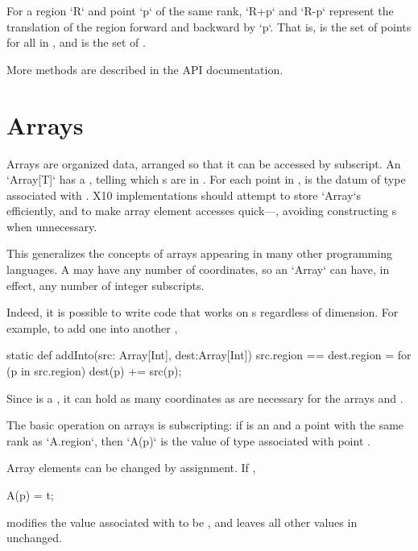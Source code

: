 For a region \xcdmath`R` and point \xcdmath`p` of the same rank,
\xcd`R+p` 
and
\xcd`R-p` 
represent the translation of the region
forward 
and backward 
by \xcdmath`p`. That is,  is the set of points
 for all  in , and  is the set of .

More  methods are described in the API documentation.

\section{Arrays}

Arrays are organized data, arranged so that it can be accessed by subscript.
An \xcd`Array[T]`  has a  , telling which
s are in .  For each point  in ,
 is the datum of type  associated with .  X10
implementations should 
attempt to store \xcd`Array`s efficiently, and to make array element accesses
quick---\eg, avoiding constructing s when unnecessary.

This generalizes the concepts of arrays appearing in many other programming
languages.  A  may have any number of coordinates, so an
\xcd`Array` can have, in effect, any number of integer subscripts.  

Indeed, it is possible to write code that works on s regardless 
of dimension.  For example, to add one   into another
, 
\begin{xten}
static def addInto(src: Array[Int], dest:Array[Int])
  {src.region == dest.region}
  = {
    for (p in src.region) 
       dest(p) += src(p);
  }
\end{xten}
\noindent
Since  is a , it can hold as many coordinates as are
necessary for the arrays  and .

The basic operation on arrays is subscripting: if  is an 
and  a point with the same rank as \xcd`A.region`, then
\xcd`A(p)`
is the value of type  associated with point .

Array elements can be changed by assignment. If , 
\begin{xten}
A(p) = t;
\end{xten}
modifies the value associated with  to be , and leaves all other
values in  unchanged.


